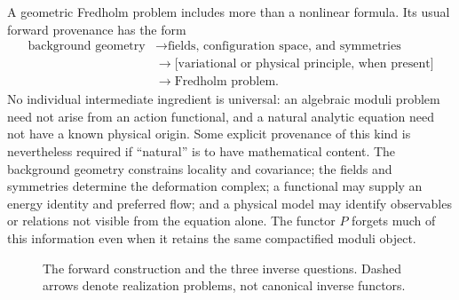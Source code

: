 \documentclass[11pt,letterpaper,twoside]{article}
\theoremstyle{plain}
\theoremstyle{definition}
\theoremstyle{remark}
\begin{document}
A geometric Fredholm problem includes more than a nonlinear formula.  Its usual forward provenance has the form
\begin{equation}\label{eq:fredholm-provenance}
\begin{aligned}
 \text{background geometry}
 &\longrightarrow \text{fields, configuration space, and symmetries}\\
 &\longrightarrow
 \bigl[\text{variational or physical principle, when present}\bigr]\\
 &\longrightarrow \text{Fredholm problem}.
\end{aligned}
\end{equation}
No individual intermediate ingredient is universal: an algebraic moduli problem need not arise from an action functional, and a natural analytic equation need not have a known physical origin.  Some explicit provenance of this kind is nevertheless required if ``natural'' is to have mathematical content.  The background geometry constrains locality and covariance; the fields and symmetries determine the deformation complex; a functional may supply an energy identity and preferred flow; and a physical model may identify observables or relations not visible from the equation alone.  The functor \(P\) forgets much of this information even when it retains the same compactified moduli object.

\begin{figure}[t]
\centering
{}
\caption{The forward construction and the three inverse questions.  Dashed arrows denote realization problems, not canonical inverse functors.}
\label{fig:program}
\end{figure}
\end{document}
